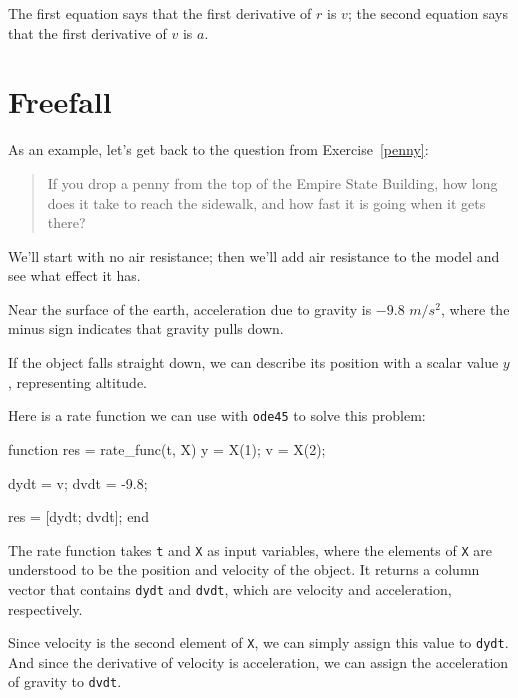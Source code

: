 \documentclass[
]{book}
\numberwithin{Answer}{chapter}
\numberwithin{Exercise}{chapter}
\begin{document}
The first equation says that the first derivative of $r$ is $v$;
the second equation says that the first derivative of $v$ is $a$.


\section{Freefall}
\label{sect:freefall}

As an example, let's get back to the question from Exercise~\ref{penny}:

\begin{quote}
If you drop a penny from the top of the Empire State Building, how long does it take to reach the sidewalk, and how fast it is going when it gets there?
\end{quote}

We'll start with no air resistance; then we'll add air resistance to the model and see what effect it has.


Near the surface of the earth,
acceleration due to gravity is $-9.8$ $m/s^2$, where the minus sign
indicates that gravity pulls down.

If the object falls straight down, we can describe its position with a
scalar value $y$, representing altitude.

Here is a rate function we can use with {\tt ode45} to solve
this problem:

\begin{code}
function res = rate_func(t, X)
    y = X(1);      
    v = X(2);      
    
    dydt = v;
    dvdt = -9.8;

    res = [dydt; dvdt];
end
\end{code}

The rate function takes {\tt t} and {\tt X} as input variables, where the elements of {\tt X} are understood to be the position and velocity of the object.
It returns a column vector that contains {\tt dydt} and {\tt dvdt}, which
are velocity and acceleration, respectively.


Since velocity is the second element of {\tt X}, we can simply assign this value to {\tt dydt}.
And since the derivative of velocity is acceleration, we can assign the acceleration of gravity to {\tt dvdt}.
\end{document}
